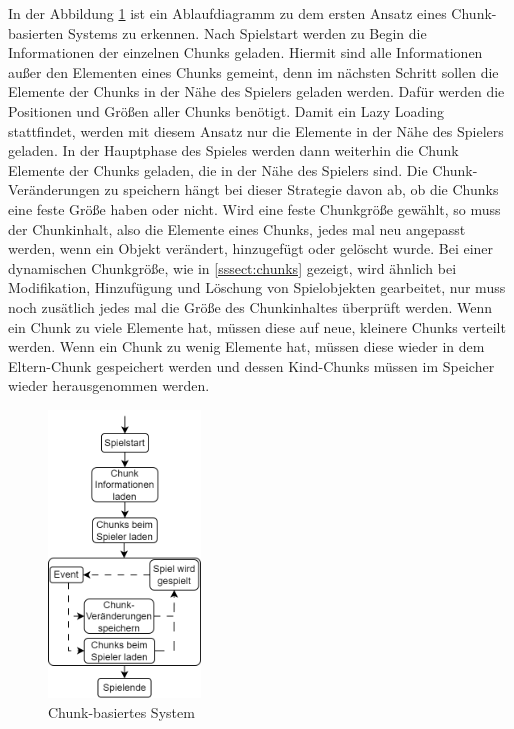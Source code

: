 In der Abbildung \ref{fig:chunkBasedSystem} ist ein Ablaufdiagramm zu dem ersten Ansatz  eines Chunk-basierten Systems zu erkennen. Nach Spielstart werden zu Begin die Informationen der einzelnen Chunks geladen. Hiermit sind alle Informationen außer den Elementen eines Chunks gemeint, denn im nächsten Schritt sollen die Elemente der Chunks in der Nähe des Spielers geladen werden. Dafür werden die Positionen und Größen aller Chunks benötigt. Damit ein Lazy Loading stattfindet, werden mit diesem Ansatz nur die Elemente in der Nähe des Spielers geladen. In der Hauptphase des Spieles werden dann weiterhin die Chunk Elemente der Chunks geladen, die in der Nähe des Spielers sind. Die Chunk-Veränderungen zu speichern hängt bei dieser Strategie davon ab, ob die Chunks eine feste Größe haben oder nicht. Wird eine feste Chunkgröße gewählt, so muss der Chunkinhalt, also die Elemente eines Chunks, jedes mal neu angepasst werden, wenn ein Objekt verändert, hinzugefügt oder gelöscht wurde.  Bei einer dynamischen Chunkgröße, wie in \ref{sssect:chunks} gezeigt, wird ähnlich bei Modifikation, Hinzufügung und Löschung von Spielobjekten gearbeitet, nur muss noch zusätlich jedes mal die Größe des Chunkinhaltes überprüft werden. Wenn ein Chunk zu viele Elemente hat, müssen diese auf neue, kleinere Chunks verteilt werden. Wenn ein Chunk zu wenig Elemente hat, müssen diese wieder in dem Eltern-Chunk gespeichert werden und dessen Kind-Chunks müssen im Speicher wieder herausgenommen werden.

\begin{figure}[htp]
    \centering
    \includegraphics[width=0.36\textwidth]{images/Chunkbasiert.png}
    \caption{Chunk-basiertes System}
    \label{fig:chunkBasedSystem}
\end{figure}

